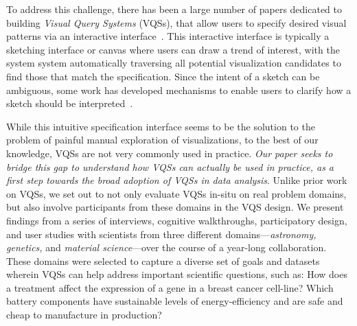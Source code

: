 \par To address this challenge, 
there has been a large number of papers 
dedicated to building {\em Visual Query Systems} (VQSs), 
that allow users to specify 
desired visual patterns 
via an interactive interface~\cite{mohebbi2011google,Hochheiser2004,wattenberg2001sketching,Siddiqui2017VLDB,ryall2005querylines,correll2016semantics,Mannino2018,Eichmann2015,Holz2009}. 
This interactive interface is typically 
a sketching interface or canvas
where users can draw a trend of interest,
with the system system automatically traversing 
all potential visualization candidates 
to find those that match the specification. 
Since the intent of a sketch can be ambiguous, 
some work has developed mechanisms to
enable users to clarify 
how a sketch should be interpreted~\cite{ryall2005querylines,correll2016semantics,Mannino2018,Eichmann2015,Holz2009}. 

\par 
While this intuitive 
specification interface 
seems to be the solution 
to the problem of painful manual exploration of visualizations, 
to the best of our knowledge, VQSs are not very commonly used in practice. 
{\em Our paper seeks to bridge this gap 
to understand how VQSs can actually be used in practice, 
as a first step towards the broad adoption of VQSs in data analysis}.
Unlike prior work on VQSs,
we set out to not only evaluate VQSs in-situ on
real problem domains, but also involve participants
from these domains in the VQS design. 
We present findings from a series of interviews, 
cognitive walkthroughs, participatory design, 
and user studies with scientists from three different domains---{\em astronomy, genetics,} and {\em material science}---over the course of 
a year-long collaboration. 
These domains were selected to capture 
a diverse set of goals 
and datasets wherein VQSs can help address 
important scientific questions, such as: 
How does a treatment affect the expression 
of a gene in a breast cancer cell-line? 
Which battery components have sustainable 
levels of energy-efficiency and are safe and 
cheap to manufacture in production?

